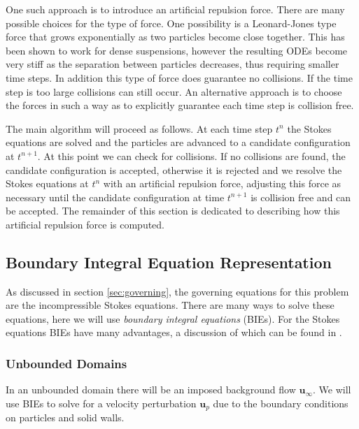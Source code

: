 \documentclass[preprint, 10pt]{elsarticle}
\begin{document}
One such approach is to introduce an artificial repulsion force. There are many possible choices for the type of force. One possibility is a Leonard-Jones type force that grows exponentially as two particles become close together. This has been shown to work for dense suspensions, however the resulting ODEs become very stiff as the separation between particles decreases, thus requiring smaller time steps. In addition this type of force does guarantee no collisions. If the time step is too large collisions can still occur. An alternative approach is to choose the forces in such a way as to explicitly guarantee each time step is collision free. 

The main algorithm will proceed as follows. At each time step $t^n$ the Stokes equations are solved and the particles are advanced to a candidate configuration at $t^{n+1}$. At this point we can check for collisions. If no collisions are found, the candidate configuration is accepted, otherwise it is rejected and we resolve the Stokes equations at $t^n$ with an artificial repulsion force, adjusting this force as necessary until the candidate configuration at time $t^{n+1}$ is collision free and can be accepted. The remainder of this section is dedicated to describing how this artificial repulsion force is computed. 

\subsection{Boundary Integral Equation Representation}

As discussed in section \ref{sec:governing}, the governing equations for this problem are the incompressible Stokes equations. There are many ways to solve these equations, here we will use \textit{boundary integral equations} (BIEs). For the Stokes equations BIEs have many advantages, a discussion of which can be found in \cite{Karrila1989}. 

\subsubsection{Unbounded Domains}

In an unbounded domain there will be an imposed background flow $\mathbf{u}_{\infty}$. We will use BIEs to solve for a velocity perturbation $\mathbf{u}_p$ due to the boundary conditions on particles and solid walls.
\end{document}
